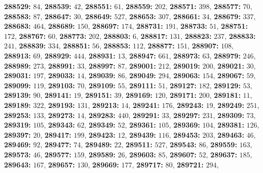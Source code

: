 \textsf{\bfseries 288529:} $84$, \textsf{\bfseries 288539:} $42$, \textsf{\bfseries 288551:} $61$, \textsf{\bfseries 288559:} $202$, \textsf{\bfseries 288571:} $398$, \textsf{\bfseries 288577:} $70$, \textsf{\bfseries 288583:} $87$, \textsf{\bfseries 288647:} $30$, \textsf{\bfseries 288649:} $527$, \textsf{\bfseries 288653:} $307$, \textsf{\bfseries 288661:} $34$, \textsf{\bfseries 288679:} $337$, \textsf{\bfseries 288683:} $464$, \textsf{\bfseries 288689:} $150$, \textsf{\bfseries 288697:} $174$, \textsf{\bfseries 288731:} $191$, \textsf{\bfseries 288733:} $51$, \textsf{\bfseries 288751:} $172$, \textsf{\bfseries 288767:} $60$, \textsf{\bfseries 288773:} $202$, \textsf{\bfseries 288803:} $6$, \textsf{\bfseries 288817:} $131$, \textsf{\bfseries 288823:} $237$, \textsf{\bfseries 288833:} $241$, \textsf{\bfseries 288839:} $334$, \textsf{\bfseries 288851:} $56$, \textsf{\bfseries 288853:} $112$, \textsf{\bfseries 288877:} $151$, \textsf{\bfseries 288907:} $108$, \textsf{\bfseries 288913:} $69$, \textsf{\bfseries 288929:} $444$, \textsf{\bfseries 288931:} $13$, \textsf{\bfseries 288947:} $661$, \textsf{\bfseries 288973:} $63$, \textsf{\bfseries 288979:} $246$, \textsf{\bfseries 288989:} $273$, \textsf{\bfseries 288991:} $33$, \textsf{\bfseries 288997:} $87$, \textsf{\bfseries 289001:} $212$, \textsf{\bfseries 289019:} $200$, \textsf{\bfseries 289021:} $30$, \textsf{\bfseries 289031:} $197$, \textsf{\bfseries 289033:} $14$, \textsf{\bfseries 289039:} $86$, \textsf{\bfseries 289049:} $294$, \textsf{\bfseries 289063:} $154$, \textsf{\bfseries 289067:} $59$, \textsf{\bfseries 289099:} $119$, \textsf{\bfseries 289103:} $70$, \textsf{\bfseries 289109:} $55$, \textsf{\bfseries 289111:} $51$, \textsf{\bfseries 289127:} $182$, \textsf{\bfseries 289129:} $53$, \textsf{\bfseries 289139:} $90$, \textsf{\bfseries 289141:} $19$, \textsf{\bfseries 289151:} $39$, \textsf{\bfseries 289169:} $120$, \textsf{\bfseries 289171:} $200$, \textsf{\bfseries 289181:} $11$, \textsf{\bfseries 289189:} $322$, \textsf{\bfseries 289193:} $131$, \textsf{\bfseries 289213:} $14$, \textsf{\bfseries 289241:} $176$, \textsf{\bfseries 289243:} $19$, \textsf{\bfseries 289249:} $251$, \textsf{\bfseries 289253:} $133$, \textsf{\bfseries 289273:} $14$, \textsf{\bfseries 289283:} $440$, \textsf{\bfseries 289291:} $33$, \textsf{\bfseries 289297:} $231$, \textsf{\bfseries 289309:} $73$, \textsf{\bfseries 289319:} $105$, \textsf{\bfseries 289343:} $62$, \textsf{\bfseries 289349:} $52$, \textsf{\bfseries 289361:} $105$, \textsf{\bfseries 289369:} $104$, \textsf{\bfseries 289381:} $126$, \textsf{\bfseries 289397:} $20$, \textsf{\bfseries 289417:} $199$, \textsf{\bfseries 289423:} $12$, \textsf{\bfseries 289439:} $116$, \textsf{\bfseries 289453:} $203$, \textsf{\bfseries 289463:} $46$, \textsf{\bfseries 289469:} $92$, \textsf{\bfseries 289477:} $74$, \textsf{\bfseries 289489:} $22$, \textsf{\bfseries 289511:} $527$, \textsf{\bfseries 289543:} $86$, \textsf{\bfseries 289559:} $163$, \textsf{\bfseries 289573:} $46$, \textsf{\bfseries 289577:} $159$, \textsf{\bfseries 289589:} $26$, \textsf{\bfseries 289603:} $85$, \textsf{\bfseries 289607:} $52$, \textsf{\bfseries 289637:} $185$, \textsf{\bfseries 289643:} $167$, \textsf{\bfseries 289657:} $130$, \textsf{\bfseries 289669:} $177$, \textsf{\bfseries 289717:} $80$, \textsf{\bfseries 289721:} $294$, 

